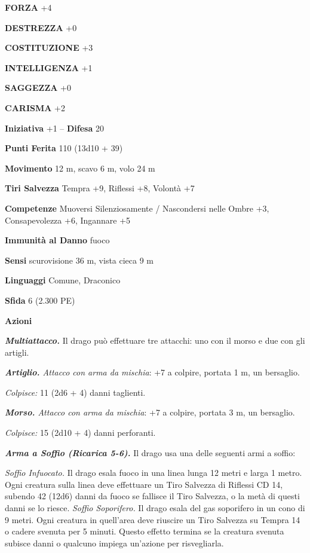 \begin{multicols}{2}
\textbf{FORZA} +4

\textbf{DESTREZZA} +0

\textbf{COSTITUZIONE} +3

\textbf{INTELLIGENZA} +1

\textbf{SAGGEZZA} +0

\textbf{CARISMA} +2

\textbf{Iniziativa} +1 -- \textbf{Difesa} 20

\textbf{Punti Ferita} 110 (13d10 + 39)

\textbf{Movimento} 12 m, scavo 6 m, volo 24 m

\textbf{Tiri Salvezza} Tempra +9, Riflessi +8, Volontà +7

\textbf{Competenze} Muoversi Silenziosamente / Nascondersi nelle Ombre +3, Consapevolezza +6, Ingannare +5

\textbf{Immunità al Danno} fuoco

\textbf{Sensi} scurovisione 36 m, vista cieca 9 m

\textbf{Linguaggi} Comune, Draconico

\textbf{Sfida} 6 (2.300 PE)

\textbf{Azioni}

\emph{\textbf{Multiattacco.}} Il drago può effettuare tre attacchi: uno con il morso e due con gli artigli.

\emph{\textbf{Artiglio.} Attacco con arma da mischia}: +7 a colpire, portata 1 m, un bersaglio.

\emph{Colpisce:} 11 (2d6 + 4) danni taglienti.

\emph{\textbf{Morso.} Attacco con arma da mischia}: +7 a colpire, portata 3 m, un bersaglio.

\emph{Colpisce:} 15 (2d10 + 4) danni perforanti.

\emph{\textbf{Arma a Soffio (Ricarica 5-6).}} Il drago usa una delle seguenti armi a soffio:

\emph{Soffio Infuocato.} Il drago esala fuoco in una linea lunga 12 metri e larga 1 metro. Ogni creatura sulla linea deve effettuare un Tiro Salvezza di Riflessi CD 14, subendo 42 (12d6) danni da fuoco se fallisce il Tiro Salvezza, o la metà di questi danni se lo riesce. \emph{Soffio Soporifero.} Il drago esala del gas soporifero in un cono di 9 metri. Ogni creatura in quell'area deve riuscire un Tiro Salvezza su Tempra 14 o cadere svenuta per 5 minuti. Questo effetto termina se la creatura svenuta subisce danni o qualcuno impiega un'azione per risvegliarla.


\end{multicols}
